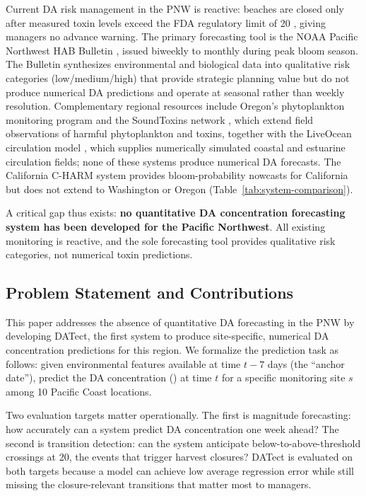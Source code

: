 \documentclass[toxins,article,submit,moreauthors]{Definitions/mdpi}
\begin{document}
Current DA risk management in the PNW is reactive: beaches are closed only after measured toxin levels exceed the FDA regulatory limit of \SI{20}{\microgrampeg} \cite{McCabe2023}, giving managers no advance warning. The primary forecasting tool is the NOAA Pacific Northwest HAB Bulletin \cite{McCabe2023}, issued biweekly to monthly during peak bloom season. The Bulletin synthesizes environmental and biological data into qualitative risk categories (low/medium/high) that provide strategic planning value \cite{Jin2024} but do not produce numerical DA predictions and operate at seasonal rather than weekly resolution. Complementary regional resources include Oregon's phytoplankton monitoring program \cite{McKibben2015} and the SoundToxins network \cite{Trainer2023}, which extend field observations of harmful phytoplankton and toxins, together with the LiveOcean circulation model \cite{MacCready2021}, which supplies numerically simulated coastal and estuarine circulation fields; none of these systems produce numerical DA forecasts. The California C-HARM system \cite{Anderson2016} provides bloom-probability nowcasts for California but does not extend to Washington or Oregon (Table~\ref{tab:system-comparison}).

A critical gap thus exists: \textbf{no quantitative DA concentration forecasting system has been developed for the Pacific Northwest}. All existing monitoring is reactive, and the sole forecasting tool provides qualitative risk categories, not numerical toxin predictions.

\subsection{Problem Statement and Contributions}
\label{sec:intro-problem}

This paper addresses the absence of quantitative DA forecasting in the PNW by developing DATect, the first system to produce site-specific, numerical DA concentration predictions for this region. We formalize the prediction task as follows: given environmental features available at time $t - 7$ days (the ``anchor date''), predict the DA concentration (\si{\microgrampeg}) at time $t$ for a specific monitoring site $s$ among 10 Pacific Coast locations.

Two evaluation targets matter operationally. The first is magnitude forecasting: how accurately can a system predict DA concentration one week ahead? The second is transition detection: can the system anticipate below-to-above-threshold crossings at \SI{20}{\microgrampeg}, the events that trigger harvest closures? DATect is evaluated on both targets because a model can achieve low average regression error while still missing the closure-relevant transitions that matter most to managers.
\end{document}
